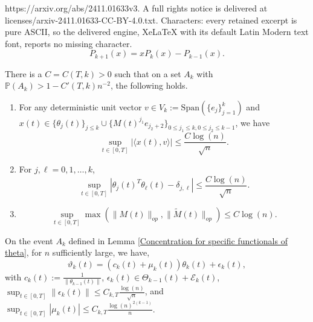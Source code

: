 \documentclass[10pt,a4paper]{amsart}
\newcommand{\la}{\langle}
\newcommand{\pr}{\mathbb{P}}
\newcommand{\ra}{\rangle}
\begin{document}
https://arxiv.org/abs/2411.01633v3. A full rights notice is delivered at licenses/arxiv-2411.01633-CC-BY-4.0.txt. Characters: every retained excerpt is pure ASCII, so the delivered engine, XeLaTeX with its default Latin Modern text font, reports no missing character.
\begin{equation}
    P_{k+1}(x) = x P_k(x)-P_{k-1}(x).
    \label{Three term reccurence}
\end{equation}

\begin{lm}\label{Concentration for specific functionals of theta}
    There is a $C=C(T,k)>0$ such that on a set $A_k$ with $\pr(A_k)>1-C'(T,k)n^{-2}$, the following holds. 
    \begin{enumerate}
        \item For any deterministic unit vector $v \in V_{k}:=\mathrm{Span}(\{e_j\}_{j=1}^k)$ and $x(t) \in \{\theta_j(t)\}_{j\leq k} \cup\{M(t)^{j_1}e_{j_2+2}\}_{0 \leq j_1 \leq k, 0 \leq j_2 \leq k-1}$, we have
    \begin{equation}
        \sup_{t \in [0,T]} |\la x(t),v \ra| \leq \frac{C\log(n)}{\sqrt{n}}.
        \label{Single Component bound}
    \end{equation}
    \item For $j, \ell =0,1,\dots,k$,
    \begin{equation}
        \sup_{t \in [0,T]} |\theta_j(t)^T\theta_{\ell}(t)-\delta_{j,\ell}| \leq \frac{C\log(n)}{\sqrt{n}}.
        \label{inner product concentration}
    \end{equation}
    \item 
    \begin{equation}
        \sup_{t \in [0,T]} \max(\|M(t)\|_{op},\|\tilde{M}(t)\|_{op}) \leq C\log(n).
    \end{equation}
    \end{enumerate}
\end{lm}

\begin{prop}
   On the event $A_k$ defined in Lemma \ref{Concentration for specific functionals of theta}, for $n$ sufficiently large, we have,
\begin{equation}\label{vartheta = theta + epsilon}
        \vartheta_k(t) = (c_k(t)+\mu_k(t))\theta_k(t)+\epsilon_k(t),
    \end{equation}
    with $c_k(t):=\frac{1}{\|\theta_{k-1}(t)\|}$, $\epsilon_k(t) \in \Theta_{k-1}(t)+ \mathcal{E}_k(t)$, $\sup_{t \in [0,T]}\|\epsilon_k(t)\| \leq C_{k,T} \frac{\log(n)}{\sqrt{n}}$, and $\sup_{t \in [0,T]} |\mu_k(t)| \leq C_{k,T}\frac{\log(n)^{2(k-1)}}{n}$.
\end{prop}
\end{document}
